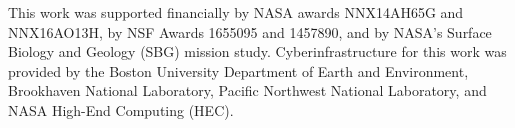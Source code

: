 \documentclass[gmd, manuscript]{copernicus}
\begin{document}

\begin{acknowledgements}
  This work was supported financially by
  NASA awards NNX14AH65G and NNX16AO13H,
  by NSF Awards 1655095 and 1457890,
  and by NASA's Surface Biology and Geology (SBG) mission study.
  Cyberinfrastructure for this work was provided by the
  Boston University Department of Earth and Environment,
  Brookhaven National Laboratory,
  Pacific Northwest National Laboratory,
  and NASA High-End Computing (HEC).
\end{acknowledgements}
















\end{document}
